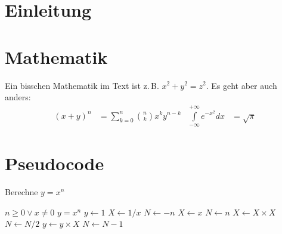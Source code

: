 \section{Einleitung}%
\label{sec:einleitung}

\blindtext

\section{Mathematik}%
\label{sec:mathematik}

Ein bisschen Mathematik im Text ist z.\,B. $x^2 + y^2 = z^2$.
Es geht aber auch anders:
\begin{align*}
  {(x+y)}^n & = \sum\limits_{k=0}^{n} \binom{n}{k} x^k y^{n-k}
  & \int\limits_{-\infty}^{+\infty} e^{-x^2} dx & = \sqrt{\pi}
\end{align*}

\section{Pseudocode}%
\label{sec:pseudocode}

\begin{algorithm}
  \caption{Berechne $y = x^n$}
  \begin{algorithmic}
    \REQUIRE $n \geq 0 \vee x \neq 0$
    \ENSURE $y = x^n$
    \STATE $y \leftarrow 1$
    \STATE $X \leftarrow 1 / x$
    \STATE $N \leftarrow -n$
    \ELSE
    \STATE $X \leftarrow x$
    \STATE $N \leftarrow n$
    \ENDIF
    \STATE $X \leftarrow X \times X$
    \STATE $N \leftarrow N / 2$
    \STATE $y \leftarrow y \times X$
    \STATE $N \leftarrow N - 1$
    \ENDIF
    \ENDWHILE
  \end{algorithmic}
\end{algorithm}
